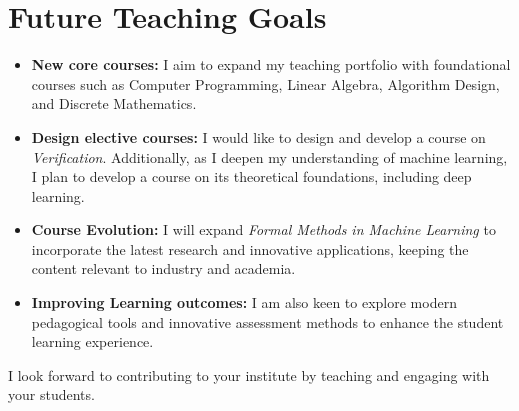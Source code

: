 \documentclass[11pt,a4paper,sans]{moderncv} %
\begin{document}
\section{Future Teaching Goals}
\begin{itemize}

\item \textbf{New core courses:} I aim to expand my teaching portfolio with foundational courses such as Computer Programming, Linear Algebra, Algorithm Design, and Discrete Mathematics.

\item \textbf{Design elective courses:} I would like to design and develop a course on \emph{Verification}. Additionally, as I deepen my understanding of machine learning, I plan to develop a course on its theoretical foundations, including deep learning.

\item \textbf{Course Evolution:} I will expand \emph{Formal Methods in Machine Learning} to incorporate the latest research and innovative applications, keeping the content relevant to industry and academia.

\item \textbf{Improving Learning outcomes:} I am also keen to explore modern pedagogical tools and innovative assessment methods to enhance the student learning experience. \\
\end{itemize}

I look forward to contributing to your institute by teaching and engaging with your students.
\end{document}
